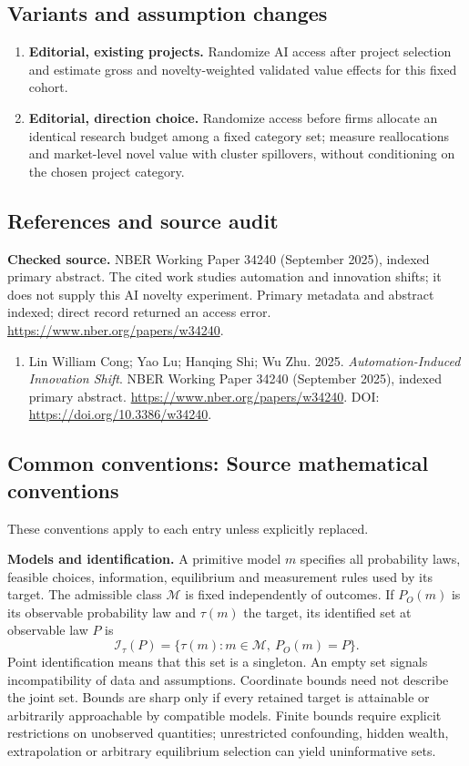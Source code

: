 \documentclass[11pt,a4paper]{article}
\begin{document}
\subsection*{Variants and assumption changes}
\begin{enumerate}
\item \textbf{Editorial, existing projects.} Randomize AI access after project selection and estimate gross and novelty-weighted validated value effects for this fixed cohort.
\item \textbf{Editorial, direction choice.} Randomize access before firms allocate an identical research budget among a fixed category set; measure reallocations and market-level novel value with cluster spillovers, without conditioning on the chosen project category.
\end{enumerate}
\subsection*{References and source audit}
\textbf{Checked source.} NBER Working Paper 34240 (September 2025), indexed primary abstract. The cited work studies automation and innovation shifts; it does not supply this AI novelty experiment. Primary metadata and abstract indexed; direct record returned an access error. \url{https://www.nber.org/papers/w34240}.
\begin{enumerate}\raggedright
\item\hypertarget{definitions:source:30007701:1}{} Lin William Cong; Yao Lu; Hanqing Shi; Wu Zhu. 2025. \emph{Automation-Induced Innovation Shift}. NBER Working Paper 34240 (September 2025), indexed primary abstract.
\url{https://www.nber.org/papers/w34240}.
DOI: \url{https://doi.org/10.3386/w34240}.
\end{enumerate}

\subsection*{Common conventions: Source mathematical conventions}

These conventions apply to each entry unless explicitly replaced.

\textbf{Models and identification.} A primitive model \(m\) specifies all probability laws, feasible choices, information, equilibrium and measurement rules used by its target. The admissible class \(\mathcal M\) is fixed independently of outcomes. If \(P_O(m)\) is its observable probability law and \(\tau(m)\) the target, its identified set at observable law \(P\) is
\[
 \mathcal I_\tau(P)=\{\tau(m):m\in\mathcal M,\ P_O(m)=P\}.
\]
Point identification means that this set is a singleton. An empty set signals incompatibility of data and assumptions. Coordinate bounds need not describe the joint set. Bounds are sharp only if every retained target is attainable or arbitrarily approachable by compatible models. Finite bounds require explicit restrictions on unobserved quantities; unrestricted confounding, hidden wealth, extrapolation or arbitrary equilibrium selection can yield uninformative sets.
\end{document}
